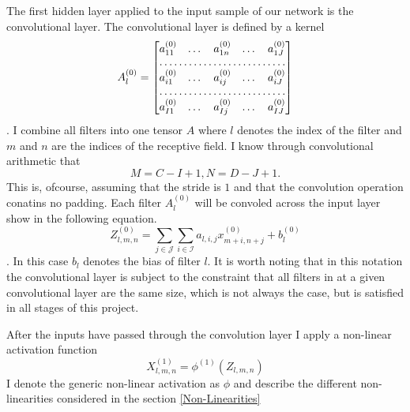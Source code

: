 \documentclass{article}
\begin{document}
The first hidden layer applied to the input sample of our network is the convolutional layer.  The convolutional layer is defined by a kernel 
\begin{equation}
A^{(0)}_l=  \begin{bmatrix}
a^{(0)}_{11}  & \dots & a^{(0)}_{1n}& \dots& a^{(0)}_{1J} \\
\hdotsfor{5} \\
a^{(0)}_{i1}        & \dots& a^{(0)}_{ij} & \dots& a^{(0)}_{iJ}\\
\hdotsfor{5}\\
a^{(0)}_{I1}        & \dots & a^{(0)}_{Ij}& \dots &a^{(0)}_{IJ}
\end{bmatrix}
\end{equation}. I combine all filters into one tensor $A$ where $l$ denotes the index of the filter and $m$ and $n$ are the indices of the receptive field. I know through convolutional arithmetic that 
\begin{equation}
M=C-I+1,
N=D-J+1.
\end{equation} This is, ofcourse, assuming that the stride is $1$ and that the convolution operation conatins no padding.
 Each filter $A^({0})_l$ will be convoled across the input layer show in the following equation.
\begin{equation}
	Z^{(0)}_{l,m,n} = \sum_{j\in \mathcal{J}}\sum_{i \in \mathcal{I}}a_{l,i,j} x^{(0)}_{m+i, n+j}+b^{(0)}_{l}
\end{equation}.  In this case $b_l$ denotes the bias of filter $l$. It is worth noting that in this notation the convolutional layer is subject to the constraint that all filters in at a given convolutional layer are the same size, which is not always the case, but is satisfied in all stages of this project.

After the inputs have passed through the convolution layer I apply a non-linear activation function
\begin{equation}
	X^{(1)}_{l,m,n} = \phi^{(1)}(Z_{l,m,n})
\end{equation}
I denote the generic non-linear activation as $\phi$ and describe the different non-linearities considered in the section \ref{Non-Linearities}
\end{document}
